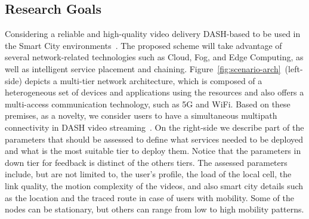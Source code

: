 
\subsection*{Research Goals}
\label{sec:research-goals}

Considering a reliable and high-quality video delivery DASH-based to be used in the Smart City environments~\cite{gamaUCC2019, KreuzbergerWorkshop2016}. The proposed scheme will take advantage of several network-related technologies such as Cloud, Fog, and Edge Computing, as well as intelligent service placement and chaining. Figure~\ref{fig:scenario-arch}~(left-side) depicts a multi-tier network architecture, which is composed of a heterogeneous set of devices and applications using the resources and also offers a multi-access communication technology, such as 5G and WiFi. Based on these premises, as a novelty, we consider users to have a simultaneous multipath connectivity in DASH video streaming~\cite{poliakovPHD2018, Velasquez2018}.
On the right-side we describe part of the parameters that should be assessed to define what services needed to be deployed and what is the most suitable tier to deploy them. Notice that the parameters in down tier for feedback is distinct of the others tiers.
The assessed parameters include, but are not limited to, the user's profile, the load of the local cell, the link quality, the motion complexity of the videos, and also smart city details such as the location and the traced route in case of users with mobility. Some of the nodes can be stationary, but others can range from low to high mobility patterns. %

